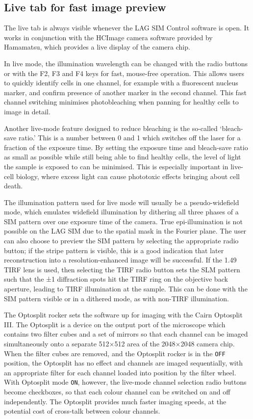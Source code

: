 \subsection{Live tab for fast image preview} \label{sec:lagsimLive}
The live tab is always visible whenever the LAG SIM Control software is open. 
It works in conjunction with the HCImage camera software provided by Hamamatsu, which provides a live display of the camera chip. 

In live mode, the illumination wavelength can be changed with the radio buttons or with the F2, F3 and F4 keys for fast, mouse-free operation. 
This allows users to quickly identify cells in one channel, for example with a fluorescent nucleus marker, and confirm presence of another marker in the second channel.
This fast channel switching minimises photobleaching when panning for healthy cells to image in detail. 

Another live-mode feature designed to reduce bleaching is the so-called `bleach-save ratio.' 
This is a number between 0 and 1 which switches off the laser for a fraction of the exposure time. 
By setting the exposure time and bleach-save ratio as small as possible while still being able to find healthy cells, the level of light the sample is exposed to can be minimised.
This is especially important in live-cell biology, where excess light can cause phototoxic effects bringing about cell death. 

The illumination pattern used for live mode will usually be a pseudo-widefield mode, which emulates widefield illumination by dithering all three phases of a SIM pattern over one exposure time of the camera. 
True epi-illumination is not possible on the LAG SIM due to the spatial mask in the Fourier plane. 
The user can also choose to preview the SIM pattern by selecting the appropriate radio button; if the stripe pattern is visible, this is a good indication that later reconstruction into a resolution-enhanced image will be successful. 
If the \SI{1.49}{\numaperture} TIRF lens is used, then selecting the TIRF radio button sets the SLM pattern such that the ±1 diffraction spots hit the TIRF ring on the objective back aperture, leading to TIRF illumination at the sample. 
This can be done with the SIM pattern visible or in a dithered mode, as with non-TIRF illumination. 

The Optosplit rocker sets the software up for imaging with the Cairn Optosplit III. 
The Optosplit is a device on the output port of the microscope which contains two filter cubes and a set of mirrors so that each channel can be imaged simultaneously onto a separate 512$\times$512 area of the 2048$\times$2048 camera chip.
When the filter cubes are removed, and the Optosplit rocker is in the \texttt{OFF} position, the Optosplit has no effect and channels are imaged sequentially, with an appropriate filter for each channel loaded into position by the filter wheel. 
With Optosplit mode \texttt{ON}, however, the live-mode channel selection radio buttons become checkboxes, so that each colour channel can be switched on and off independently. 
The Optosplit provides much faster imaging speeds, at the potential cost of cross-talk between colour channels. 

